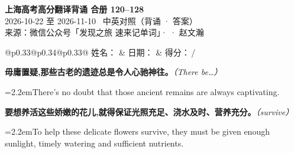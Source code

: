 \documentclass[11pt,a4paper]{article}
\newcommand{\num}[1]{\makebox[1.9em][r]{#1.}\hspace{0.3em}}
\newcommand{\prompt}[1]{\emph{\textcolor{tipblue}{\small（#1）}}}
\begin{document}
\pagestyle{plain}
\begin{center}
{\LARGE\bfseries 上海高考高分翻译背诵 \quad 合册 120–128}\\[0.25em]
{\large 2026-10-22 至 2026-11-10 \quad\ 中英对照（背诵 · 答案）}\\[0.35em]
{\footnotesize 来源：微信公众号「发现之旅 速来记单词」·  · 赵文瀚}
\end{center}

\vspace{0.4em}
\noindent\begin{tabular}{@{}p{0.33\textwidth}@{}p{0.34\textwidth}@{}p{0.33\textwidth}@{}}
姓名：\underline{\hspace{2.0cm}} & 日期：\underline{\hspace{2.0cm}} & 得分：\underline{\hspace{1.4cm}}\,/ \\
\end{tabular}

\vspace{0.5em}

\vspace{0.8em}
\vspace{0.35em}\vspace{0.15em}

\begin{minipage}{\linewidth}

\num{1}\textbf{毋庸置疑,那些古老的遗迹总是令人心驰神往。}\prompt{There be…}

\vspace{0.15em}

\noindent\hangindent=2.2em\hspace{2.2em}There’s no doubt that those ancient remains are always captivating.

\end{minipage}

\begin{minipage}{\linewidth}

\num{2}\textbf{要想养活这些娇嫩的花儿,就得保证光照充足、浇水及时、营养充分。}\prompt{survive}

\vspace{0.15em}

\noindent\hangindent=2.2em\hspace{2.2em}To help these delicate flowers survive, they must be given enough sunlight, timely watering and sufficient nutrients.

\end{minipage}
\end{document}
